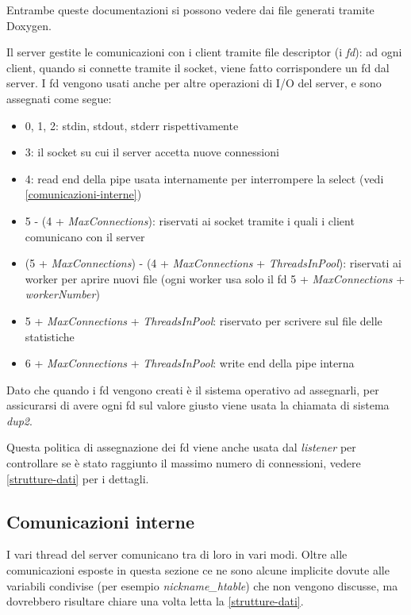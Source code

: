 \documentclass[a4paper]{article}
\theoremstyle{theorem}
\theoremstyle{remark}
\theoremstyle{definition}
\theoremstyle{corollary}
\theoremstyle{lemma}
\newcommand\codeName[1]{%
	\textit{#1}}
\begin{document}
Entrambe queste documentazioni si possono vedere dai file generati tramite Doxygen.

Il server gestite le comunicazioni con i client tramite file descriptor (i \textit{fd}): ad ogni client, quando si connette tramite il socket, viene fatto corrispondere un fd dal server. I fd vengono usati anche per altre operazioni di I/O del server, e sono assegnati come segue:
\begin{itemize}
	\item 0, 1, 2: stdin, stdout, stderr rispettivamente
	\item 3: il socket su cui il server accetta nuove connessioni
	\item 4: read end della pipe usata internamente per interrompere la select (vedi \autoref{comunicazioni-interne})
	\item 5 - (4 + \codeName{MaxConnections}): riservati ai socket tramite i quali i client comunicano con il server
	\item (5 + \codeName{MaxConnections}) - (4 + \codeName{MaxConnections} + \codeName{ThreadsInPool}): riservati ai worker per aprire nuovi file (ogni worker usa solo il fd 5 + \codeName{MaxConnections} + \codeName{workerNumber})
	\item 5 + \codeName{MaxConnections} + \codeName{ThreadsInPool}: riservato per scrivere sul file delle statistiche
	\item 6 + \codeName{MaxConnections} + \codeName{ThreadsInPool}: write end della pipe interna
\end{itemize}
Dato che quando i fd vengono creati è il sistema operativo ad assegnarli, per assicurarsi di avere ogni fd sul valore giusto viene usata la chiamata di sistema \codeName{dup2}.

Questa politica di assegnazione dei fd viene anche usata dal \codeName{listener} per controllare se è stato raggiunto il massimo numero di connessioni, vedere \autoref{strutture-dati} per i dettagli.

\subsection{Comunicazioni interne}\label{comunicazioni-interne}
I vari thread del server comunicano tra di loro in vari modi. Oltre alle comunicazioni esposte in questa sezione ce ne sono alcune implicite dovute alle variabili condivise (per esempio \codeName{nickname\_htable}) che non vengono discusse, ma dovrebbero risultare chiare una volta letta la \autoref{strutture-dati}.
\end{document}
